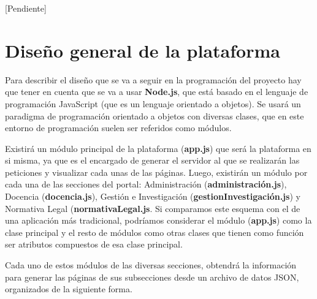 [Pendiente]
 
\section{Diseño general de la plataforma}

Para describir el diseño que se va a seguir en la programación del proyecto hay que tener en cuenta que se va a usar 
\textbf{Node.js}, que está basado en el lenguaje de programación JavaScript (que es un lenguaje orientado a objetos). Se usará 
un paradigma de programación orientado a objetos con diversas clases, que en este entorno de programación suelen ser referidos 
como módulos.

\bigskip
Existirá un módulo principal de la plataforma (\textbf{app.js}) que será la plataforma en si misma, ya que es el encargado
de generar el servidor al que se realizarán las peticiones y visualizar cada unas de las páginas. Luego, existirán un módulo
por cada una de las secciones del portal: Administración (\textbf{administración.js}), Docencia (\textbf{docencia.js}), Gestión
e Investigación (\textbf{gestionInvestigación.js}) y Normativa Legal (\textbf{normativaLegal.js}. Si comparamos este esquema
con el de una aplicación más tradicional, podríamos considerar el módulo (\textbf{app.js}) como la clase principal y el resto
de módulos como otras clases que tienen como función ser atributos compuestos de esa clase principal.

\bigskip
Cada uno de estos módulos de las diversas secciones, obtendrá la información para generar las páginas de sus subsecciones 
desde un archivo de datos JSON, organizados de la siguiente forma.

